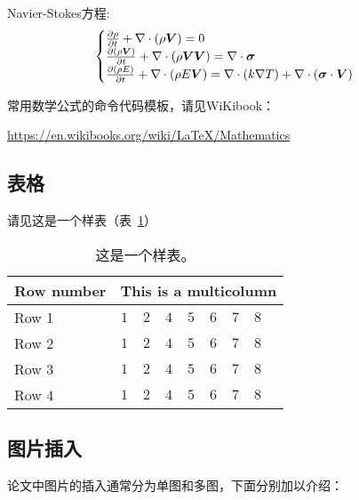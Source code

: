 Navier-Stokes方程:
\begin{equation} \label{eq:ns}
    \begin{cases}
        \frac{\partial \rho}{\partial t} + \nabla\cdot(\rho\boldsymbol{V}) = 0 \\
        \frac{\partial (\rho\boldsymbol{V})}{\partial t} + \nabla\cdot(\rho\boldsymbol{V}\boldsymbol{V}) = \nabla\cdot\boldsymbol{\mathsf{\sigma}}\\
        \frac{\partial (\rho E)}{\partial t} + \nabla\cdot(\rho E\boldsymbol{V}) = \nabla\cdot(k\nabla T) + \nabla\cdot(\boldsymbol{\mathsf{\sigma}}\cdot\boldsymbol{V})
    \end{cases}
\end{equation}

常用数学公式的命令代码模板，请见WiKibook：

\url{https://en.wikibooks.org/wiki/LaTeX/Mathematics}

\subsection{表格}

请见这是一个样表（表~\ref{tab:sample}）
\begin{table}[!htbp]
    \centering
    \footnotesize%
    \setlength{\tabcolsep}{4pt}%
    \renewcommand{\arraystretch}{1.2}%
    \begin{tabular}{lcccccccc}
        \hline\hline
        Row number & \multicolumn{8}{c}{This is a multicolumn} \\
        \hline
        Row 1 & $1$ & $2$ & $4$ & $5$ & $6$ & $7$ & $8$\\
        \hline
        Row 2 & $1$ & $2$ & $4$ & $5$ & $6$ & $7$ & $8$\\
        \hline
        Row 3 & $1$ & $2$ & $4$ & $5$ & $6$ & $7$ & $8$\\
        \hline
        Row 4 & $1$ & $2$ & $4$ & $5$ & $6$ & $7$ & $8$\\
        \hline\hline
    \end{tabular}
    \caption{这是一个样表。}
    \label{tab:sample}
\end{table}

\subsection{图片插入}

论文中图片的插入通常分为单图和多图，下面分别加以介绍：

